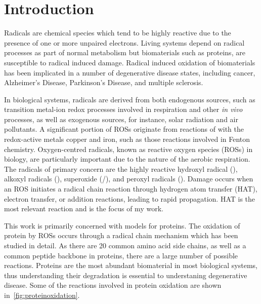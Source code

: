 
 \chapter{Introduction}

Radicals are chemical species which tend to be highly reactive due to the presence of one or more unpaired electrons. Living systems depend on radical processes as part of normal metabolism but biomaterials such as proteins, are susceptible to radical induced damage. Radical induced oxidation of biomaterials has been implicated in a number of degenerative disease states, including cancer, Alzheimer's Disease, Parkinson's Disease, and multiple sclerosis.\cite{Barnham2004,Halliwell2007,Valko2007,Hwang2013,Halliwell2015}

In biological systems, radicals are derived from both endogenous sources, such as transition metal-ion redox processes involved in respiration and other \emph{in vivo} processes, as well as exogenous sources, for instance, solar radiation and air pollutants. A significant portion of ROSs originate from reactions of  with the redox-active metals copper and iron,\cite{Halliwell2015} such as those reactions involved in Fenton chemistry.\cite{Stohs1995} Oxygen-centred radicals, known as reactive oxygen species (ROSs) in biology, are particularly important due to the nature of the aerobic respiration. The radicals of primary concern are the highly reactive hydroxyl radical (), alkoxyl radicals (), superoxide (/), and peroxyl radicals ().\cite{Halliwell2015} Damage occurs when an ROS initiates a radical chain reaction through hydrogen atom transfer (HAT), electron transfer, or addition reactions, leading to rapid propagation. HAT is the most relevant reaction and is the focus of my work.

This work is primarily concerned with models for proteins. The oxidation of protein by ROSs occurs through a radical chain mechanism which has been studied in detail.\cite{Berlett1997,Davies2016} As there are 20 common amino acid side chains, as well as a common peptide backbone in proteins, there are a large number of possible reactions. Proteins are the most abundant biomaterial in most biological systems,\cite{Davies2005} thus understanding their degradation is essential to understaning degenerative disease. Some of the reactions involved in protein oxidation are shown in~\ref{fig:proteinoxidation}.

